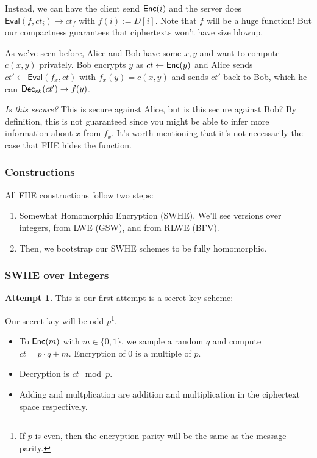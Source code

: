 Instead, we can have the client send $\operatorname{\mathsf{Enc}}(i)$ and the server does $\mathsf{Eval}(f, ct_i)\to ct_f$ with $f(i) := D[i]$. Note that $f$ will be a huge function! But our compactness guarantees that ciphertexts won't have size blowup.

\begin{example}[Secure 2PC]
    As we've seen before, Alice and Bob have some $x, y$ and want to compute $c(x,y)$ privately. Bob encrypts $y$ as $ct\leftarrow \operatorname{\mathsf{Enc}}(y)$ and Alice sends $ct' \leftarrow \mathsf{Eval}(f_x, ct)$ with $f_x(y) = c(x,y)$ and sends $ct'$ back to Bob, which he can $\operatorname{\mathsf{Dec}}_{sk}(ct')\to f(y)$.

\end{example}

\emph{Is this secure?} This is secure against Alice, but is this secure against Bob? By definition, this is not guaranteed since you might be able to infer more information about $x$ from $f_x$. It's worth mentioning that it's not necessarily the case that FHE hides the function.

\subsubsection{Constructions}
All FHE constructions follow two steps:
\begin{enumerate}
    \item Somewhat Homomorphic Encryption (SWHE). We'll see versions over integers, from LWE (GSW), and from RLWE (BFV).
    \item Then, we bootstrap our SWHE schemes to be fully homomorphic.
\end{enumerate}

\subsubsection{SWHE over Integers}\label{sec:apr06-swhe-integers}
\textbf{Attempt 1.} This is our first attempt is a secret-key scheme:

Our secret key will be odd $p$\footnote{If $p$ is even, then the encryption parity will be the same as the message parity.}.

\begin{itemize}
    \item To $\operatorname{\mathsf{Enc}}(m)$ with $m\in \{0, 1\}$, we sample a random $q$ and compute $ct = p\cdot q + m$. Encryption of $0$ is a multiple of $p$.
    \item Decryption is $ct\mod p$.
    \item Adding and multplication are addition and multiplication in the ciphertext space respectively.
\end{itemize}

